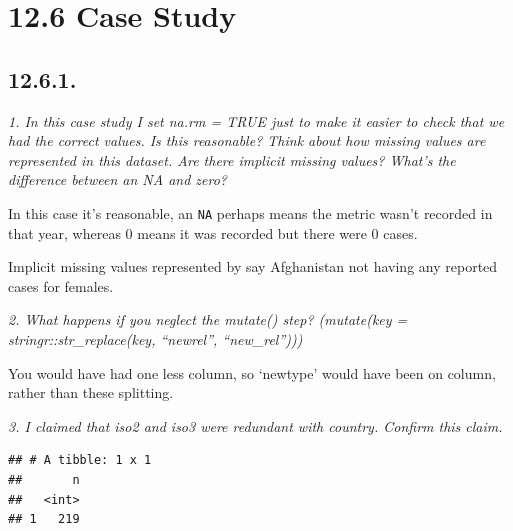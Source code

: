 \documentclass[]{book}
\newenvironment{Shaded}{\begin{snugshade}}{\end{snugshade}}
\newcommand{\DataTypeTok}[1]{\textcolor[rgb]{0.13,0.29,0.53}{#1}}
\newcommand{\DecValTok}[1]{\textcolor[rgb]{0.00,0.00,0.81}{#1}}
\newcommand{\KeywordTok}[1]{\textcolor[rgb]{0.13,0.29,0.53}{\textbf{#1}}}
\newcommand{\NormalTok}[1]{#1}
\newcommand{\OperatorTok}[1]{\textcolor[rgb]{0.81,0.36,0.00}{\textbf{#1}}}
\newcommand{\StringTok}[1]{\textcolor[rgb]{0.31,0.60,0.02}{#1}}
\theoremstyle{definition}
\theoremstyle{definition}
\theoremstyle{definition}
\theoremstyle{remark}
\begin{document}
\hypertarget{case-study}{%
\section{12.6 Case Study}\label{case-study}}

\hypertarget{section-35}{%
\subsection{12.6.1.}\label{section-35}}

\emph{1. In this case study I set na.rm = TRUE just to make it easier to
check that we had the correct values. Is this reasonable? Think about
how missing values are represented in this dataset. Are there implicit
missing values? What's the difference between an NA and zero?}

In this case it's reasonable, an \texttt{NA} perhaps means the metric
wasn't recorded in that year, whereas 0 means it was recorded but there
were 0 cases.

Implicit missing values represented by say Afghanistan not having any
reported cases for females.

\emph{2. What happens if you neglect the mutate() step? (mutate(key =
stringr::str\_replace(key, ``newrel'', ``new\_rel'')))}

You would have had one less column, so `newtype' would have been on
column, rather than these splitting.

\emph{3. I claimed that iso2 and iso3 were redundant with country.
Confirm this claim.}

\begin{Shaded}
\end{Shaded}

\begin{verbatim}
## # A tibble: 1 x 1
##       n
##   <int>
## 1   219
\end{verbatim}

\begin{Shaded}
\end{Shaded}
\end{document}

